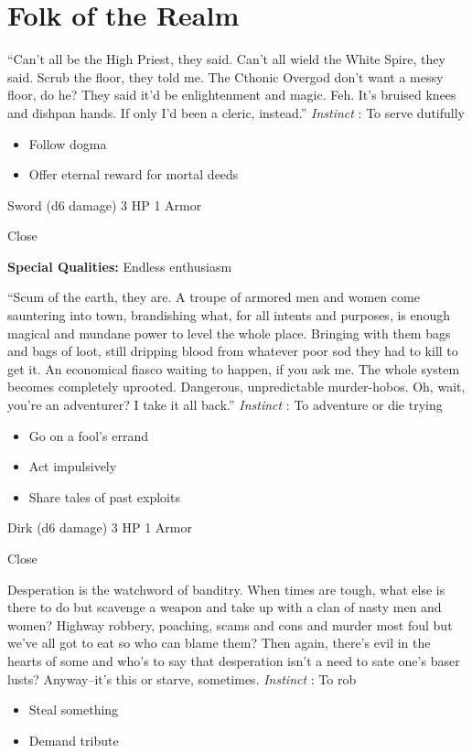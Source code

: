 \section{Folk of the Realm}




 ``Can't all be the High Priest, they said. Can't all wield the White Spire, they said. Scrub the floor, they told me. The Cthonic Overgod don't want a messy floor, do he? They said it'd be enlightenment and magic. Feh. It's bruised knees and dishpan hands. If only I'd been a cleric, instead.'' \emph{Instinct}
: To serve dutifully
\begin{itemize}
\item Follow dogma
\item Offer eternal reward for mortal deeds

\end{itemize}




 Sword (d6 damage) 3 HP 1 Armor


 Close


 \textbf{Special Qualities:}
 Endless enthusiasm


 ``Scum of the earth, they are. A troupe of armored men and women come sauntering into town, brandishing what, for all intents and purposes, is enough magical and mundane power to level the whole place. Bringing with them bags and bags of loot, still dripping blood from whatever poor sod they had to kill to get it. An economical fiasco waiting to happen, if you ask me. The whole system becomes completely uprooted. Dangerous, unpredictable murder-hobos. Oh, wait, you're an adventurer? I take it all back.'' \emph{Instinct}
: To adventure or die trying
\begin{itemize}
\item Go on a fool's errand
\item Act impulsively
\item Share tales of past exploits

\end{itemize}




 Dirk (d6 damage) 3 HP 1 Armor


 Close


 Desperation is the watchword of banditry. When times are tough, what else is there to do but scavenge a weapon and take up with a clan of nasty men and women? Highway robbery, poaching, scams and cons and murder most foul but we've all got to eat so who can blame them? Then again, there's evil in the hearts of some and who's to say that desperation isn't a need to sate one's baser lusts? Anyway--it's this or starve, sometimes. \emph{Instinct}
: To rob
\begin{itemize}
\item Steal something
\item Demand tribute

\end{itemize}



